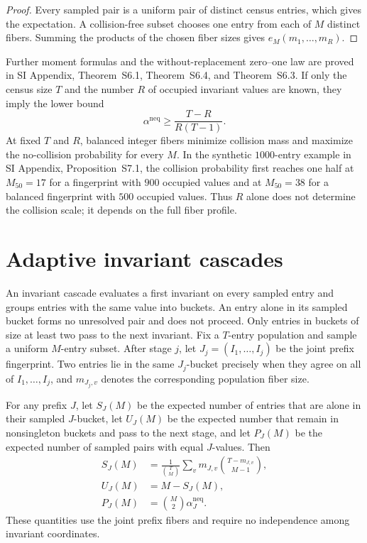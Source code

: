\documentclass[9pt,twoside]{pnas-new}
\theoremstyle{definition}
\theoremstyle{remark}
\newcommand{\neqp}{\mathrm{neq}}
\newcommand{\SILocation}[1]{SI Appendix, #1}
\newcommand{\SIFiniteMoments}{Theorem~S6.1}
\newcommand{\SIFiniteBirthdayLaw}{Theorem~S6.3}
\newcommand{\SIExactFiniteCurves}{Theorem~S6.4}
\newcommand{\SIFiniteBenchmark}{Proposition~S7.1}
\begin{document}
\begin{proof}
Every sampled pair is a uniform pair of distinct census entries, which gives the expectation.  A collision-free subset chooses one entry from each of $M$ distinct fibers.  Summing the products of the chosen fiber sizes gives $e_M(m_1,\ldots,m_R)$.
\end{proof}

Further moment formulas and the without-replacement zero--one law are proved in \SILocation{\SIFiniteMoments{}, \SIExactFiniteCurves{}, and \SIFiniteBirthdayLaw{}}.  If only the census size $T$ and the number $R$ of occupied invariant values are known, they imply the lower bound
\begin{equation}
 \alpha^{\neqp}\ge\frac{T-R}{R(T-1)}.
 \label{eq:support-compression-bound}
\end{equation}
At fixed $T$ and $R$, balanced integer fibers minimize collision mass and maximize the no-collision probability for every $M$.  In the synthetic $1000$-entry example in \SILocation{\SIFiniteBenchmark{}}, the collision probability first reaches one half at $M_{50}=17$ for a fingerprint with $900$ occupied values and at $M_{50}=38$ for a balanced fingerprint with $500$ occupied values.  Thus $R$ alone does not determine the collision scale; it depends on the full fiber profile.
\section{Adaptive invariant cascades}
\label{sec:cascades}
An invariant cascade evaluates a first invariant on every sampled entry and groups entries with the same value into buckets.  An entry alone in its sampled bucket forms no unresolved pair and does not proceed.  Only entries in buckets of size at least two pass to the next invariant.  Fix a $T$-entry population and sample a uniform $M$-entry subset.  After stage $j$, let $J_j=(I_1,\ldots,I_j)$ be the joint prefix fingerprint.  Two entries lie in the same $J_j$-bucket precisely when they agree on all of $I_1,\ldots,I_j$, and $m_{J_j,v}$ denotes the corresponding population fiber size.

For any prefix $J$, let $S_J(M)$ be the expected number of entries that are alone in their sampled $J$-bucket, let $U_J(M)$ be the expected number that remain in nonsingleton buckets and pass to the next stage, and let $P_J(M)$ be the expected number of sampled pairs with equal $J$-values.  Then
\begin{align}
 S_J(M)
 &=\frac{1}{\binom TM}\sum_v m_{J,v}\binom{T-m_{J,v}}{M-1},
 \label{eq:expected-singletons}\\
 U_J(M)&=M-S_J(M),
 \label{eq:expected-survivors}\\
 P_J(M)&=\binom M2\alpha_J^{\neqp}.
 \label{eq:expected-unresolved-pairs}
\end{align}
These quantities use the joint prefix fibers and require no independence among invariant coordinates.
\end{document}

